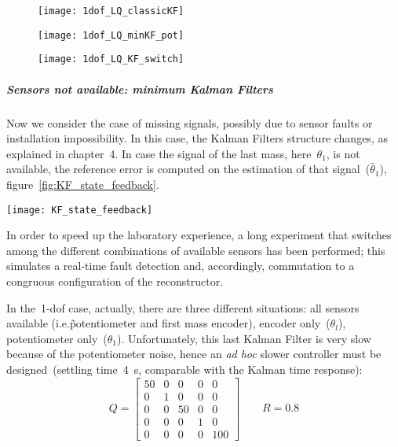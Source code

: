 \begin{figure*}
	\centering
	\begin{subfigure}{0.45\columnwidth}
		\texttt{[image: 1dof\_LQ\_classicKF]}
		\label{fig:1dof_LQ_classicKF}
	\end{subfigure}
	\begin{subfigure}{0.45\columnwidth}
		\texttt{[image: 1dof\_LQ\_minKF\_pot]}
		\label{fig:1dof_LQ_minKF_pot}
	\end{subfigure}
	\newline
	\begin{subfigure}{\columnwidth}
		\centering
		\texttt{[image: 1dof\_LQ\_KF\_switch]}
		\label{fig:1dof_LQ_KF_switch}
	\end{subfigure}
	\caption{LQG with different sensors available, \acrshort{1-dof} case}
\end{figure*}

\subparagraph{Sensors not available: minimum Kalman Filters}

Now we consider the case of missing signals, possibly due to sensor faults or installation impossibility. In this case, the Kalman Filters structure changes, as explained in chapter~4. In case the signal of the last mass, here~$\theta_1$, is not available, the reference error is computed on the estimation of that signal~($\hat\theta_1$), figure~\ref{fig:KF_state_feedback}. \\

\begin{figure*}
	\centering
	\texttt{[image: KF\_state\_feedback]}
	\caption{State measurement not available: estimated state feedback, \acrshort{1-dof} case}
	\label{fig:KF_state_feedback}
\end{figure*}

In order to speed up the laboratory experience, a long experiment that switches among the different combinations of available sensors has been performed; this simulates a real-time fault detection and, accordingly, commutation to a congruous configuration of the reconstructor.

In the~\acrshort{1-dof} case, actually, there are three different situations: all sensors available (i.e.\~potentiometer and first mass encoder), encoder only~($\theta_l$), potentiometer only~($\theta_1$). Unfortunately, this last Kalman Filter is very slow because of the potentiometer noise, hence an \textit{ad hoc} slower controller must be designed~(settling time~4~s, comparable with the Kalman time response):
\begin{equation}
	Q =
	\begin{bmatrix}
		50 & 0 & 0 & 0 & 0 \\
		0 & 1 & 0 & 0 & 0 \\
		0 & 0 & 50 & 0 & 0 \\
		0 & 0 & 0 & 1 & 0 \\
		0 & 0 & 0 & 0 & 100
	\end{bmatrix}
	\qquad
	R = 0.8
\end{equation}


